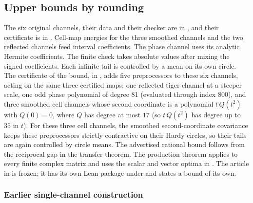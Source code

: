 \documentclass[11pt,a4paper]{article}
\begin{document}
\subsection{Upper bounds by rounding}

The six original channels, their data and their checker are in
, and their certificate is in . Cell-map energies for the three smoothed channels
and the two reflected channels feed interval coefficients. The phase channel
uses its analytic Hermite coefficients. The finite check takes absolute values
after mixing the signed coefficients. Each infinite tail is controlled by a
mean on its own circle. The certificate of the bound, in , adds five preprocessors
to these six channels, acting on the same three certified maps: one reflected tiger channel at a steeper scale,
one odd phase polynomial of degree 81 (evaluated through index 800), and three smoothed cell channels whose second coordinate is a
polynomial $t\,Q(t^2)$ with $Q(0)=0$, where $Q$ has degree at most $17$ (so $t\,Q(t^2)$ has degree up to $35$ in $t$). For these three cell channels, the smoothed second-coordinate covariance
keeps these preprocessors strictly contractive on their Hardy circles, so their tails are again controlled by circle means.
The advertised rational bound follows from the reciprocal
gap in the transfer theorem. The production theorem applies to every finite
complex matrix and uses the scalar and vector optima in .
The article in  is frozen; it has its own Lean package under
 and states a bound of its own.

\subsubsection*{Earlier single-channel construction}
\end{document}
